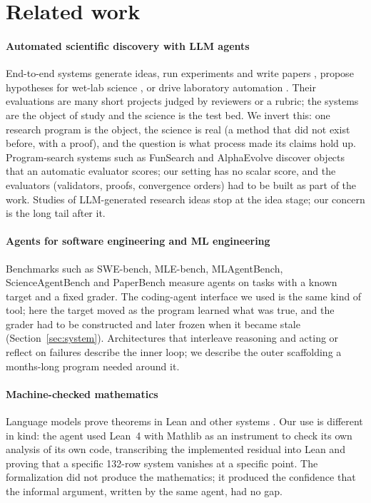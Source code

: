 \section{Related work}
\label{sec:related}

\paragraph{Automated scientific discovery with LLM agents}
End-to-end systems generate ideas, run experiments and write papers
\citep{lu2024aiscientist,yamada2025aiscientistv2,schmidgall2025agentlab,jansen2025codescientist},
propose hypotheses for wet-lab science \citep{gottweis2025coscientist}, or drive laboratory
automation \citep{boiko2023coscientist,bran2024chemcrow}. Their evaluations are many short projects judged by
reviewers or a rubric; the systems are the object of study and the science is the test bed. We
invert this: one research program is the object, the science is real (a method that did not exist
before, with a proof), and the question is what process made its claims hold up. Program-search systems such as FunSearch and AlphaEvolve
\citep{romeraparedes2024funsearch,novikov2025alphaevolve} discover objects that an automatic
evaluator scores; our setting has no scalar score, and the evaluators (validators, proofs,
convergence orders) had to be built as part of the work. Studies of LLM-generated research ideas
\citep{si2025ideas} stop at the idea stage; our concern is the long tail after it.

\paragraph{Agents for software engineering and ML engineering}
Benchmarks such as SWE-bench, MLE-bench, MLAgentBench, ScienceAgentBench and PaperBench
\citep{jimenez2024swebench,chan2025mlebench,huang2024mlagentbench,chen2025scienceagentbench,starace2025paperbench}
measure agents on tasks with a known target and a fixed grader. The coding-agent interface we used
\citep{yang2024sweagent,anthropic2025claudecode} is the same kind of tool; here the target moved as
the program learned what was true, and the grader had to be constructed and later frozen when it
became stale (Section~\ref{sec:system}). Architectures that interleave reasoning and acting or
reflect on failures \citep{yao2023react,shinn2023reflexion} describe the inner loop; we describe
the outer scaffolding a months-long program needed around it.

\paragraph{Machine-checked mathematics}
Language models prove theorems in Lean and other systems
\citep{yang2023leandojo,song2024leancopilot,xin2024deepseekprover,jiang2023dsp,trinh2024alphageometry}.
Our use is different in kind: the agent used Lean~4 with Mathlib \citep{demoura2021lean4,mathlib2020}
as an instrument to check its own analysis of its own code, transcribing the implemented residual
into Lean and proving that a specific 132-row system vanishes at a specific point. The
formalization did not produce the mathematics; it produced the confidence that the informal
argument, written by the same agent, had no gap.
